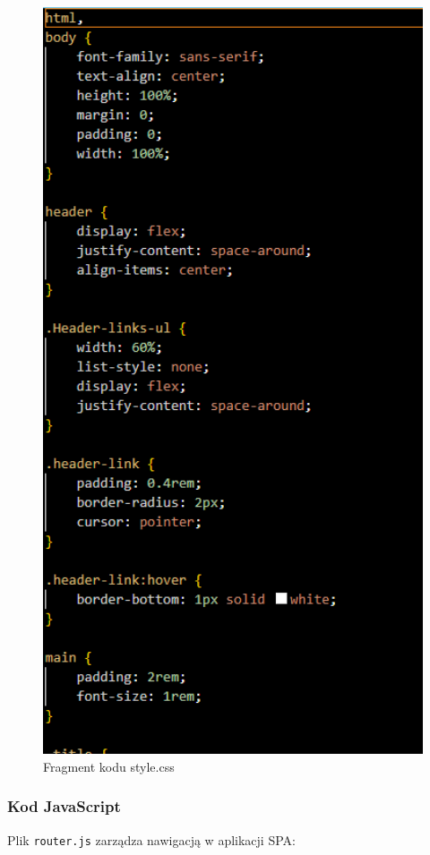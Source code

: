 \documentclass[a4paper,12pt]{article}
\begin{document}
\begin{figure}[H]
    \centering
    \includegraphics[width=1\textwidth]{images/css.png}
    \caption{Fragment kodu style.css}
\end{figure}

\subsubsection{Kod JavaScript}
Plik \texttt{router.js} zarządza nawigacją w aplikacji SPA:
\end{document}
